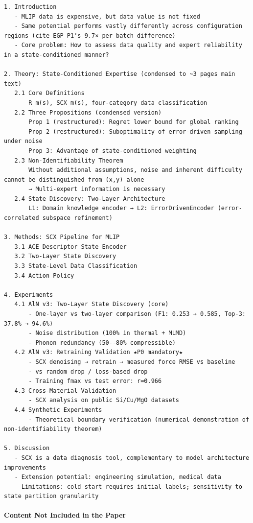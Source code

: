 \documentclass[
  12pt,
]{article}
\begin{document}
\begin{verbatim}
1. Introduction
   - MLIP data is expensive, but data value is not fixed
   - Same potential performs vastly differently across configuration regions (cite EGP P1's 9.7× per-batch difference)
   - Core problem: How to assess data quality and expert reliability in a state-conditioned manner?

2. Theory: State-Conditioned Expertise (condensed to ~3 pages main text)
   2.1 Core Definitions
       R_m(s), SCX_m(s), four-category data classification
   2.2 Three Propositions (condensed version)
       Prop 1 (restructured): Regret lower bound for global ranking
       Prop 2 (restructured): Suboptimality of error-driven sampling under noise
       Prop 3: Advantage of state-conditioned weighting
   2.3 Non-Identifiability Theorem
       Without additional assumptions, noise and inherent difficulty cannot be distinguished from (x,y) alone
       → Multi-expert information is necessary
   2.4 State Discovery: Two-Layer Architecture
       L1: Domain knowledge encoder → L2: ErrorDrivenEncoder (error-correlated subspace refinement)

3. Methods: SCX Pipeline for MLIP
   3.1 ACE Descriptor State Encoder
   3.2 Two-Layer State Discovery
   3.3 State-Level Data Classification
   3.4 Action Policy

4. Experiments
   4.1 AlN v3: Two-Layer State Discovery (core)
       - One-layer vs two-layer comparison (F1: 0.253 → 0.585, Top-3: 37.8% → 94.6%)
       - Noise distribution (100% in thermal + MLMD)
       - Phonon redundancy (50--80% compressible)
   4.2 AlN v3: Retraining Validation ★P0 mandatory★
       - SCX denoising → retrain → measured force RMSE vs baseline
       - vs random drop / loss-based drop
       - Training fmax vs test error: r=0.966
   4.3 Cross-Material Validation
       - SCX analysis on public Si/Cu/MgO datasets
   4.4 Synthetic Experiments
       - Theoretical boundary verification (numerical demonstration of non-identifiability theorem)

5. Discussion
   - SCX is a data diagnosis tool, complementary to model architecture improvements
   - Extension potential: engineering simulation, medical data
   - Limitations: cold start requires initial labels; sensitivity to state partition granularity
\end{verbatim}

\paragraph{Content Not Included in the Paper}\label{content-not-included}
\end{document}
